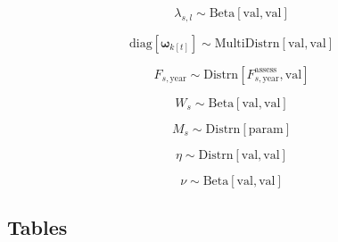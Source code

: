 \documentclass{article}
\begin{document}
\begin{equation}
  \label{eq:prior-selectivity}
  \lambda_{s,l} \sim \mathrm{Beta} \! \left[ \mathrm{val, val} \right]
\end{equation}

\begin{equation}
  \label{eq:prior-weight}
  \mathrm{diag} \! \left[ \boldsymbol{\omega}_{k[t]} \right] \sim 
    \mathrm{MultiDistrn} \! \left[  \mathrm{val, val} \right]
\end{equation}

\begin{equation}
  \label{eq:prior-fishing}
  F_{s,\mathrm{year}} \sim 
    \mathrm{Distrn} \! \left[ F^{\mathrm{assess}}_{s,\mathrm{year}} \mathrm{, val} \right]
\end{equation}

\begin{equation}
  \label{eq:prior-reporting}
  W_{s} \sim \mathrm{Beta} \! \left[ \mathrm{val, val} \right]
\end{equation}

\begin{equation}
  \label{eq:prior-mortality}
  M_{s}  \sim \mathrm{Distrn} \! \left[ \mathrm{param} \right]
\end{equation}

\begin{equation}
  \label{eq:prior-tagloss}
  \eta \sim \mathrm{Distrn} \! \left[ \mathrm{val, val} \right]
\end{equation}

\begin{equation}
  \label{eq:prior-initloss}
  \nu \sim \mathrm{Beta} \! \left[ \mathrm{val, val}  \right]
\end{equation}

\subsection{Tables}
\end{document}
